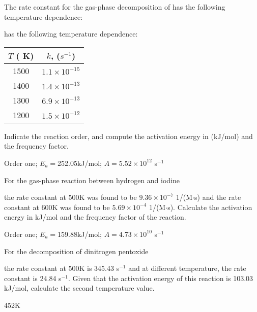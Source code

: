 \documentclass[main.tex]{subfiles}
\begin{document}
\begin{multicols*}{2}
\begin{question}[ID=\the\value{numA}]
The rate constant for the gas-phase decomposition of  
has the following temperature dependence:
\begin{center}\end{center}
has the following temperature dependence:
\begin{center}\begin{tabular}[t]{   c  c   }
\toprule
  $T$ ( K)	&$k$, ($s^{-1}$) \\
\midrule
1500&	$1.1\times 10^{-15}$\\
1400&	$1.4\times 10^{-13}$\\
1300&	$6.9\times 10^{-13}$\\
1200&$1.5\times 10^{-12}$\\
\bottomrule
\end{tabular}\end{center}
Indicate the reaction order, and compute the activation energy in (kJ/mol) and the frequency factor.
\end{question}
\begin{solution}
Order one; $E_a=$252.05kJ/mol; $A=5.52\times 10^{12}$ s$^{-1}$
\hspace{0.1cm}\end{solution}%


\begin{question}[ID=\the\value{numA}]
For the gas-phase reaction between hydrogen and iodine
 \begin{center}\end{center}
the rate constant at 500K was found to be $9.36\times 10^{-7}$ 1/(M$\cdot$s) and the rate constant at 600K was found to be $5.69\times 10^{-4}$ 1/(M$\cdot$s). Calculate the activation energy in kJ/mol and the frequency factor of the reaction.
\end{question}
\begin{solution}
Order one; $E_a=$159.88kJ/mol; $A=4.73\times 10^{10}$ s$^{-1}$
\hspace{0.1cm}\end{solution}%

\begin{question}[ID=\the\value{numA}]
For the decomposition of dinitrogen pentoxide
 \begin{center}\end{center}
the rate constant at 500K is 345.43 s$^{-1}$ and at different temperature, the rate constant is 24.84 s$^{-1}$. Given that the activation energy of this reaction is 103.03 kJ/mol, calculate the second temperature value.
\end{question}
\begin{solution}
452K
\hspace{0.1cm}\end{solution}%



\end{multicols*}
\end{document}
